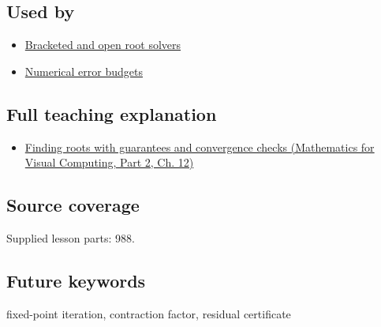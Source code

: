 \subsection{Used by}\label{appendix-d83b0ad1be7f-used-by}

\hypertarget{appendix-d83b0ad1be7f-used-by}{}

\begin{itemize}
\tightlist
\item
  \hyperref[appendix-f63eb850796d]{Bracketed and open root solvers}
\item
  \hyperref[appendix-31b8c295e05f]{Numerical error budgets}
\end{itemize}

\subsection{Full teaching explanation}\label{appendix-d83b0ad1be7f-full-teaching-explanation}

\hypertarget{appendix-d83b0ad1be7f-full-teaching-explanation}{}

\begin{itemize}
\tightlist
\item
  \href{../02-Mathematics-for-Visual-Computing-P02/main.pdf\#02-foundations-ii-ch028-finding-roots-with-guarantees-and-convergence-checks}{Finding roots with guarantees and convergence checks (Mathematics for Visual Computing, Part 2, Ch. 12)}
\end{itemize}

\subsection{Source coverage}\label{appendix-d83b0ad1be7f-source-coverage}

\hypertarget{appendix-d83b0ad1be7f-source-coverage}{}

Supplied lesson parts: 988.

\subsection{Future keywords}\label{appendix-d83b0ad1be7f-future-keywords}

\hypertarget{appendix-d83b0ad1be7f-future-keywords}{}

fixed-point iteration, contraction factor, residual certificate
